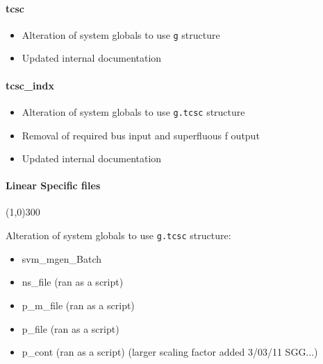 \documentclass[12pt]{article}
\begin{document}
\paragraph{tcsc}
	\begin{itemize}
		\item Alteration of system globals to use \verb|g| structure
		\item Updated internal documentation
	\end{itemize}
	
\paragraph{tcsc\_indx}
	\begin{itemize}
		\item Alteration of system globals to use \verb|g.tcsc| structure
		\item Removal of required bus input and superfluous f output
		\item Updated internal documentation
	\end{itemize}
		
\paragraph{Linear Specific files}\line(1,0){300}

Alteration of system globals to use \verb|g.tcsc| structure:

	\begin{itemize}
		\item svm\_mgen\_Batch
		\item ns\_file (ran as a script)
		\item p\_m\_file (ran as a script)
		\item p\_file (ran as a script)
		\item p\_cont (ran as a script) (larger scaling factor added 3/03/11 SGG...)
	\end{itemize}
	
	
\end{document}
